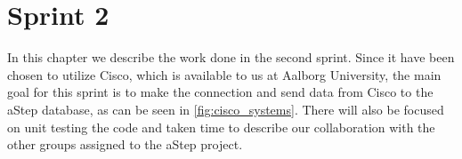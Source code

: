 \chapter{Sprint 2}
In this chapter we describe the work done in the second sprint. Since it have been chosen to utilize Cisco, which is available to us at Aalborg University, the main goal for this sprint is to make the connection and send data from Cisco to the aStep database, as can be seen in \cref{fig:cisco_systems}. There will also be focused on unit testing the code and taken time to describe our collaboration with the other groups assigned to the aStep project.


